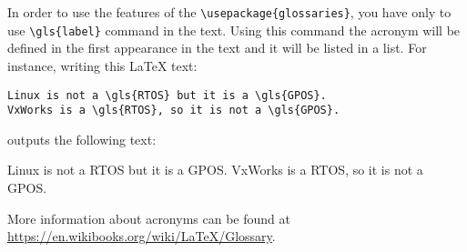 In order to use the features of the \verb|\usepackage{glossaries}|, you have only to use \verb|\gls{label}| command in the text. 
Using this command the acronym will be defined in the first appearance in the text and it will be listed in a list.
For instance, writing this \LaTeX{} text:
\begin{verbatim}
Linux is not a \gls{RTOS} but it is a \gls{GPOS}. 
VxWorks is a \gls{RTOS}, so it is not a \gls{GPOS}.
\end{verbatim}

outputs the following text: 

Linux is not a \gls{RTOS} but it is a \gls{GPOS}. VxWorks is a \gls{RTOS}, so it is not a \gls{GPOS}.

More information about acronyms can be found at 
\url{https://en.wikibooks.org/wiki/LaTeX/Glossary}.
